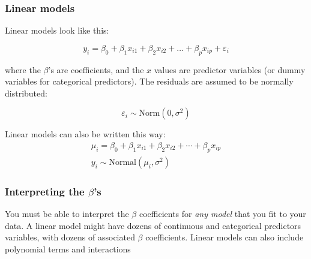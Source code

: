\documentclass[color=usenames,dvipsnames]{beamer}\usepackage[]{graphicx}\usepackage[]{color}
\begin{document}
\begin{frame}
  \frametitle{Linear models}
  {%
    Linear models look like this:}

\[
y_i = \beta_0 + \beta_1 x_{i1} + \beta_2 x_{i2} + \ldots + \beta_p x_{ip} + \varepsilon_i
\]

where the $\beta$'s are coefficients, and the $x$ values are predictor
variables (or dummy variables for categorical predictors). \pause The
residuals are assumed to be normally distributed:

\[
  \varepsilon_i \sim \mathrm{Norm}(0, \sigma^2)
\]

\pause

\vfill %



Linear models can also be written this way:
\begin{gather*}
  \mu_i = \beta_0 + \beta_1 x_{i1} + \beta_2 x_{i2} + \cdots + \beta_p x_{ip} \\
  y_i \sim \mathrm{Normal}(\mu_i, \sigma^2)
\end{gather*}

\end{frame}




\begin{frame}
  \frametitle{Interpreting the $\beta$'s}
You must be able to interpret the $\beta$
coefficients for {\it any model} that you fit to your data.
\pause
\vfill
A linear model might have dozens of continuous and categorical
predictors variables, with dozens of associated $\beta$ coefficients.
\pause
\vfill
Linear models can also include polynomial terms and interactions
\end{frame}
\end{document}
